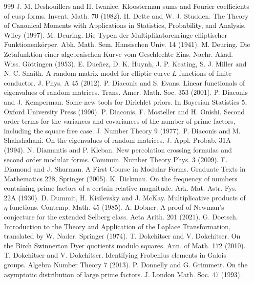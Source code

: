 \begin{thebibliography}{999}
 J. M. Deshouillers and H. Iwaniec. Kloosterman sums and Fourier coefficients of cusp forms. Invent. Math. 70 (1982).
 H. Dette and W. J. Studden. The Theory of Canonical Moments with Applications in Statistics, Probability, and Analysis. Wiley (1997).
 M. Deuring. Die Typen der Multiplikatorenringe elliptischer Funktionenk\"orper. Abh. Math. Sem. Hansischen Univ. 14 (1941).
 M. Deuring. Die Zetafunktion einer algebraischen Kurve vom Geschlechte Eins. Nachr. Akad. Wiss. G\"ottingen (1953).
 E. Due\~nez, D. K. Huynh, J. P. Keating, S. J. Miller and N. C. Snaith. A random matrix model for elliptic curve $L$ functions of finite conductor. J. Phys. A 45 (2012).
 P. Diaconis and S. Evans. Linear functionals of eigenvalues of random matrices. Trans. Amer. Math. Soc. 353 (2001).
 P. Diaconis and J. Kemperman. Some new tools for Dirichlet priors. In Bayesian Statistics 5, Oxford University Press (1996).
 P. Diaconis, F. Mosteller and H. Onishi. Second order terms for the variances and covariances of the number of prime factors, including the square free case. J. Number Theory 9 (1977).
 P. Diaconis and M. Shahshahani. On the eigenvalues of random matrices. J. Appl. Probab. 31A (1994).
 N. Diamantis and P. Kleban. New percolation crossing formulas and second order modular forms. Commun. Number Theory Phys. 3 (2009).
 F. Diamond and J. Shurman. A First Course in Modular Forms. Graduate Texts in Mathematics 228, Springer (2005).
 K. Dickman. On the frequency of numbers containing prime factors of a certain relative magnitude. Ark. Mat. Astr. Fys. 22A (1930).
 D. Dummit, H. Kisilevsky and J. McKay. Multiplicative products of $\eta$ functions. Contemp. Math. 45 (1985).
 A. Dobner. A proof of Newman's conjecture for the extended Selberg class. Acta Arith. 201 (2021).
 G. Doetsch. Introduction to the Theory and Application of the Laplace Transformation, translated by W. Nader. Springer (1974).
 T. Dokchitser and V. Dokchitser. On the Birch Swinnerton Dyer quotients modulo squares. Ann. of Math. 172 (2010).
 T. Dokchitser and V. Dokchitser. Identifying Frobenius elements in Galois groups. Algebra Number Theory 7 (2013).
 P. Donnelly and G. Grimmett. On the asymptotic distribution of large prime factors. J. London Math. Soc. 47 (1993).

\end{thebibliography}
